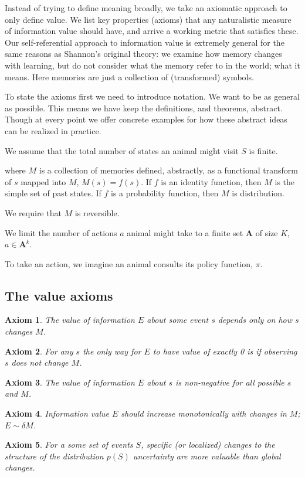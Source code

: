 \documentclass[9pt,twocolumn,twoside]{pnas-new}
\newtheorem{axiom}{Axiom}
\begin{document}
Instead of trying to define meaning broadly, we take an axiomatic approach to only define value. We list key properties (axioms) that any naturalistic measure of information value should have, and arrive a working metric that satisfies these. Our self-referential approach to information value is extremely general for the same reasons as Shannon's original theory: we examine how memory changes with learning, but do not consider what the memory refer to in the world; what it means. Here memories are just a collection of (transformed) symbols.

To state the axioms first we need to introduce notation. We want to be as general as possible. This means we have keep the definitions, and theorems, abstract. Though at every point we offer concrete examples for how these abstract ideas can be realized in practice. 

We assume that the total number of states an animal might visit $S$ is finite. 

where $M$ is a collection of memories defined, abstractly, as a functional transform of $s$ mapped into $M$, $M(s) = f(s)$. If $f$ is an identity function, then $M$ is the simple set of past states. If $f$ is a probability function, then $M$ is distribution. 

We require that $M$ is reversible. %

We limit the number of actions $a$ animal might take to a finite set $\textbf{A}$ of size $K$, $a \in \textbf{A}^k$. 

To take an action, we imagine an animal consults its policy function, $\pi$. 


\subsection*{The value axioms}
\begin{axiom}
    The value of information $E$ about some event $s$ depends \textit{only} on how $s$ changes $M$.
    \label{ax:1}
\end{axiom}
\begin{axiom}
    For any $s$ the only way for $E$ to have value of exactly 0 is if observing $s$ does not change $M$.
    \label{ax:2}
\end{axiom}
\begin{axiom}
    The value of information $E$ about $s$ is non-negative for all possible $s$ and $M$. 
    \label{ax:3}
\end{axiom}
\begin{axiom}
    Information value $E$ should increase monotonically with changes in $M$; $E \sim \delta M$.
    \label{ax:4}
\end{axiom}
\begin{axiom}
    For a some set of events $S$, specific (or localized) changes to the structure of the distribution $p(S)$ uncertainty are more valuable than global changes.
    \label{ax:5}
\end{axiom}
\end{document}
